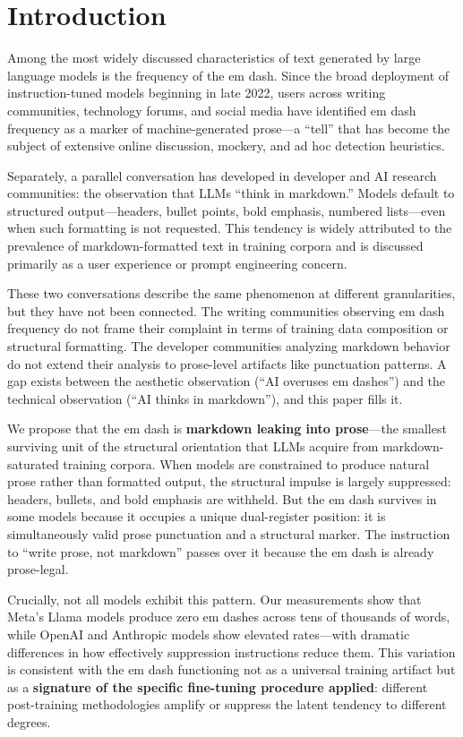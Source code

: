 \section{Introduction}
\label{sec:introduction}

Among the most widely discussed characteristics of text generated by large language models is the frequency of the em dash. Since the broad deployment of instruction-tuned models beginning in late 2022, users across writing communities, technology forums, and social media have identified em dash frequency as a marker of machine-generated prose---a ``tell'' that has become the subject of extensive online discussion, mockery, and ad hoc detection heuristics.

Separately, a parallel conversation has developed in developer and AI research communities: the observation that LLMs ``think in markdown.'' Models default to structured output---headers, bullet points, bold emphasis, numbered lists---even when such formatting is not requested. This tendency is widely attributed to the prevalence of markdown-formatted text in training corpora and is discussed primarily as a user experience or prompt engineering concern.

These two conversations describe the same phenomenon at different granularities, but they have not been connected. The writing communities observing em dash frequency do not frame their complaint in terms of training data composition or structural formatting. The developer communities analyzing markdown behavior do not extend their analysis to prose-level artifacts like punctuation patterns. A gap exists between the aesthetic observation (``AI overuses em dashes'') and the technical observation (``AI thinks in markdown''), and this paper fills it.

We propose that the em dash is \textbf{markdown leaking into prose}---the smallest surviving unit of the structural orientation that LLMs acquire from markdown-saturated training corpora. When models are constrained to produce natural prose rather than formatted output, the structural impulse is largely suppressed: headers, bullets, and bold emphasis are withheld. But the em dash survives in some models because it occupies a unique dual-register position: it is simultaneously valid prose punctuation and a structural marker. The instruction to ``write prose, not markdown'' passes over it because the em dash is already prose-legal.

Crucially, not all models exhibit this pattern. Our measurements show that Meta's Llama models produce zero em dashes across tens of thousands of words, while OpenAI and Anthropic models show elevated rates---with dramatic differences in how effectively suppression instructions reduce them. This variation is consistent with the em dash functioning not as a universal training artifact but as a \textbf{signature of the specific fine-tuning procedure applied}: different post-training methodologies amplify or suppress the latent tendency to different degrees.


